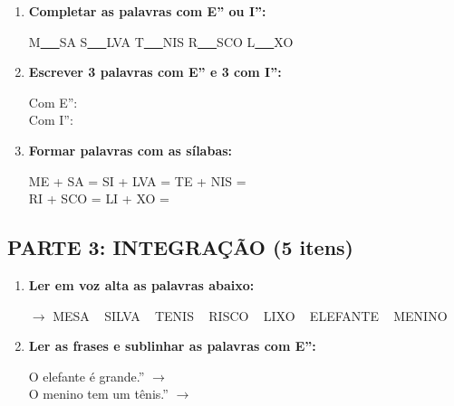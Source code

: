 \begin{exercicio}
\begin{enumerate}[resume]
  \item \textbf{Completar as palavras com E'' ou I'':}
  \begin{center}
  M\underline{~~~}SA \quad S\underline{~~~}LVA \quad T\underline{~~~}NIS \quad R\underline{~~~}SCO \quad L\underline{~~~}XO
  \end{center}

  \item \textbf{Escrever 3 palavras com E'' e 3 com I'':}
  \begin{center}
  Com E'': \underline{\hspace{2.2cm}} \underline{\hspace{2.2cm}} \underline{\hspace{2.2cm}} \\
  Com I'': \underline{\hspace{2.2cm}} \underline{\hspace{2.2cm}} \underline{\hspace{2.2cm}}
  \end{center}

  \item \textbf{Formar palavras com as sílabas:}
  \begin{center}
  ME + SA = \underline{\hspace{2cm}} \quad SI + LVA = \underline{\hspace{2cm}} \quad TE + NIS = \underline{\hspace{2cm}} \\
  RI + SCO = \underline{\hspace{2cm}} \quad LI + XO = \underline{\hspace{2cm}}
  \end{center}
\end{enumerate}

\subsection*{PARTE 3: INTEGRAÇÃO (5 itens)}

\begin{enumerate}[resume]
  \item \textbf{Ler em voz alta as palavras abaixo:}
  \begin{center}
  $\rightarrow$ MESA  ~  SILVA  ~  TENIS  ~  RISCO  ~  LIXO  ~  ELEFANTE  ~  MENINO
  \end{center}

  \item \textbf{Ler as frases e sublinhar as palavras com E'':}
  \begin{center}
  O elefante é grande.'' $\rightarrow$ \underline{\hspace{5cm}} \\
  O menino tem um tênis.'' $\rightarrow$ \underline{\hspace{5cm}}
  \end{center}


\end{enumerate}
\end{exercicio}

